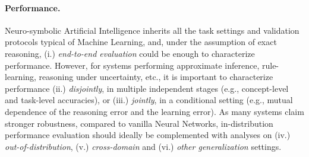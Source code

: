 \paragraph{Performance.} %
Neuro-symbolic Artificial Intelligence inherits all the task settings and validation protocols typical of Machine Learning, and, under the assumption of exact reasoning, (i.) \textit{end-to-end evaluation} could be enough to characterize performance. However, for systems performing approximate inference, rule-learning, reasoning under uncertainty, etc., it is important to characterize performance (ii.) \textit{disjointly}, in multiple independent stages (e.g., concept-level and task-level accuracies), or (iii.) \textit{jointly}, in a conditional setting (e.g., mutual dependence of the reasoning error and the learning error).
As many systems claim stronger robustness, compared to vanilla Neural Networks, in-distribution performance evaluation should ideally be complemented with analyses on (iv.) \textit{out-of-distribution}, (v.) \textit{cross-domain} and (vi.) \textit{other generalization} settings.

